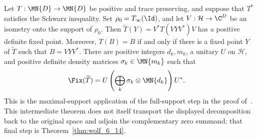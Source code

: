 \begin{theorem}%
    \label{thm:maximal_support_compression_density_blocks}
    \leanok
    Let $T:\MN{D}\to\MN{D}$ be positive and trace preserving, and suppose
    that $T^*$ satisfies the Schwarz inequality. Set
    $\rho_0=T_\infty(\Id)$, and let $V:\mathcal H\to\C^D$ be an isometry
    onto the support of $\rho_0$. Then
    $\widetilde T(Y)=V^*T(VYV^*)V$ has a positive definite fixed point.
    Moreover, $T(B)=B$ if and only if there is a fixed point $Y$ of
    $\widetilde T$ such that $B=VYV^*$. There are positive integers
    $d_k,m_k$, a unitary $U$ on $\mathcal H$, and positive definite
    density matrices $\sigma_k\in\MN{m_k}$ such that
    \begin{align}
        \Fix(\widetilde T)
         & =U\left(\bigoplus_k\sigma_k\otimes\MN{d_k}\right)U^*.
        \label{eq:spectral_max_support_blocks}
    \end{align}
    This is the maximal-support application of the full-support step in the
    proof of~\cite[Theorem~6.14]{Wolf2012Quantum}. This intermediate theorem
    does not itself transport the displayed decomposition back to the original
    space and adjoin the complementary zero summand; that final step is
    Theorem~\ref{thm:wolf_6_14}.
\end{theorem}

